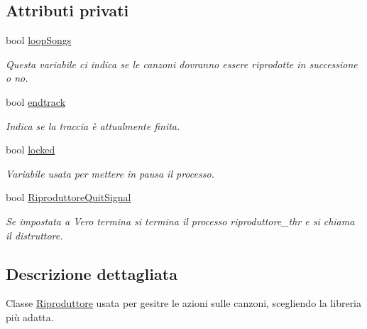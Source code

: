 \subsection*{\-Attributi privati}
\begin{DoxyCompactItemize}
\item 
\hypertarget{classRiproduttore_a25a08a505bbd71239fa4c20e0a4ddfff}{bool \hyperlink{classRiproduttore_a25a08a505bbd71239fa4c20e0a4ddfff}{loop\-Songs}}\label{classRiproduttore_a25a08a505bbd71239fa4c20e0a4ddfff}

\begin{DoxyCompactList}\small\item\em \-Questa variabile ci indica se le canzoni dovranno essere riprodotte in successione o no. \end{DoxyCompactList}\item 
\hypertarget{classRiproduttore_a865f72d47671c15cbc5bdcae6818e264}{bool \hyperlink{classRiproduttore_a865f72d47671c15cbc5bdcae6818e264}{endtrack}}\label{classRiproduttore_a865f72d47671c15cbc5bdcae6818e264}

\begin{DoxyCompactList}\small\item\em \-Indica se la traccia è attualmente finita. \end{DoxyCompactList}\item 
\hypertarget{classRiproduttore_a8903771ab92a6f33dd24b0c143758c0c}{bool \hyperlink{classRiproduttore_a8903771ab92a6f33dd24b0c143758c0c}{locked}}\label{classRiproduttore_a8903771ab92a6f33dd24b0c143758c0c}

\begin{DoxyCompactList}\small\item\em \-Variabile usata per mettere in pausa il processo. \end{DoxyCompactList}\item 
\hypertarget{classRiproduttore_a7430cced443dd19e50d266470bf3bba6}{bool \hyperlink{classRiproduttore_a7430cced443dd19e50d266470bf3bba6}{\-Riproduttore\-Quit\-Signal}}\label{classRiproduttore_a7430cced443dd19e50d266470bf3bba6}

\begin{DoxyCompactList}\small\item\em \-Se impostata a \-Vero termina si termina il processo riproduttore\-\_\-thr e si chiama il distruttore. \end{DoxyCompactList}\end{DoxyCompactItemize}


\subsection{\-Descrizione dettagliata}
\-Classe \hyperlink{classRiproduttore}{\-Riproduttore} usata per gesitre le azioni sulle canzoni, scegliendo la libreria più adatta. 

